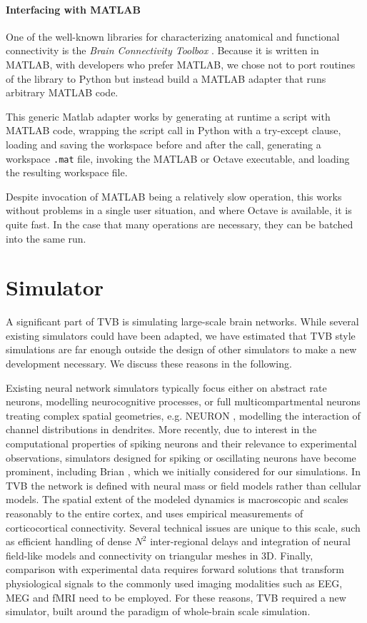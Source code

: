 \documentclass{bioinfo}
\begin{document}
\paragraph{Interfacing with MATLAB}

One of the well-known libraries for characterizing anatomical 
and functional connectivity is the \emph{Brain Connectivity Toolbox} 
\citep{Rubinov_2010}. 
Because it is written in MATLAB, with developers who prefer MATLAB, we 
chose not to port routines of the library to Python but instead build
a MATLAB adapter that runs arbitrary MATLAB code. 

This generic Matlab adapter works by generating at runtime a script with MATLAB code, 
wrapping the script call in Python with a try-except clause,  
loading and saving the workspace before and after the call,
generating a workspace \texttt{.mat} file, invoking the MATLAB or Octave
executable, and loading the resulting workspace file. 

Despite invocation of MATLAB being a relatively slow operation, this works
without problems in a single user situation, and where Octave is available, it
is quite fast. In the case that many operations are necessary, they can be
batched into the same run.

\section{Simulator}

A significant part of TVB is simulating large-scale brain networks. While
several existing simulators could have been adapted, we have estimated that
TVB style simulations are far enough outside the design of other simulators to
make a new development necessary. We discuss these reasons in the following. 

Existing neural network simulators typically focus either on abstract rate neurons, 
modelling  neurocognitive processes, or 
full multicompartmental neurons treating complex spatial
geometries, e.g. NEURON \citep{Hines_2001}, modelling the interaction of 
channel distributions in dendrites.  More recently, due to interest in
the computational properties of spiking neurons and their relevance to
experimental observations, simulators designed for spiking or oscillating neurons
have become prominent, including Brian \citep{Goodman_2009}, which we initially 
considered for our simulations.
In TVB the network is defined with neural mass or field
models \citep{Deco_2008a, Coombes_2010} rather than cellular models. The
spatial extent of the modeled dynamics is macroscopic and scales reasonably 
to the entire cortex, and uses empirical measurements of corticocortical
connectivity. Several technical issues are unique to this scale, such
as efficient handling of dense $N^2$ inter-regional delays and integration
of neural field-like models and connectivity on triangular meshes in 3D.
Finally, comparison with experimental data requires forward solutions
that transform physiological signals to the commonly
used imaging modalities such as EEG, MEG and fMRI need to be employed.
For these reasons, TVB required a new simulator, built around the paradigm
of whole-brain scale simulation.
\end{document}
